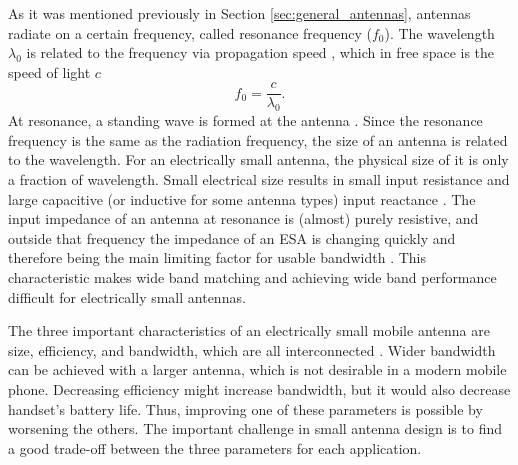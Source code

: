 As it was mentioned previously in Section \ref{sec:general_antennas}, antennas radiate on a certain frequency, called resonance frequency ($f_0$). The wavelength $\lambda_0$ is related to the frequency via propagation speed \cite{stutzman}, which in free space is the speed of light $c$
\begin{equation}
\label{eq:fcl}
    f_0 = \frac{c}{\lambda_0}.
\end{equation}
At resonance, a standing wave is formed at the antenna \cite{stutzman}. Since the resonance frequency is the same as the radiation frequency, the size of an antenna is related to the wavelength. For an electrically small antenna, the physical size of it is only a fraction of wavelength. Small electrical size results in small input resistance and large capacitive (or inductive for some antenna types) input reactance \cite{modern_small_antennas}. The input impedance of an antenna at resonance is (almost) purely resistive, and outside that frequency the impedance of an ESA is changing quickly and therefore being the main limiting factor for usable bandwidth \cite{holopainen_phd}. This characteristic makes wide band matching and achieving wide band performance difficult for electrically small antennas.

The three important characteristics of an electrically small mobile antenna are size, efficiency, and bandwidth, which are all interconnected \cite{holopainen_phd}. Wider bandwidth can be achieved with a larger antenna, which is not desirable in a modern mobile phone. Decreasing efficiency might increase bandwidth, but it would also decrease handset's battery life. Thus, improving one of these parameters is possible by worsening the others. The important challenge in small antenna design is to find a good trade-off between the three parameters for each application.

